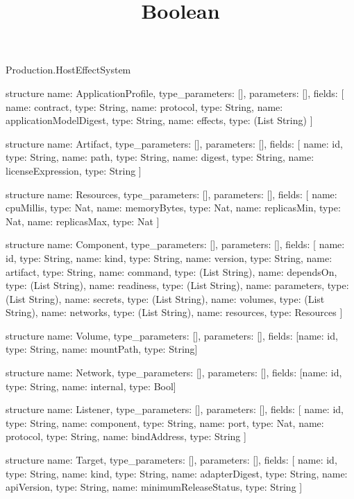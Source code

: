 \begin{lexlean}{Production.HostEffectSystem}
\title{Boolean}
\begin{semanticmodule}
structure{
  name: ApplicationProfile,
  type_parameters: [],
  parameters: [],
  fields: [
    {name: contract, type: String},
    {name: protocol, type: String},
    {name: applicationModelDigest, type: String},
    {name: effects, type: (List String)}
  ]
}

structure{
  name: Artifact,
  type_parameters: [],
  parameters: [],
  fields: [
    {name: id, type: String},
    {name: path, type: String},
    {name: digest, type: String},
    {name: licenseExpression, type: String}
  ]
}

structure{
  name: Resources,
  type_parameters: [],
  parameters: [],
  fields: [
    {name: cpuMillis, type: Nat},
    {name: memoryBytes, type: Nat},
    {name: replicasMin, type: Nat},
    {name: replicasMax, type: Nat}
  ]
}

structure{
  name: Component,
  type_parameters: [],
  parameters: [],
  fields: [
    {name: id, type: String},
    {name: kind, type: String},
    {name: version, type: String},
    {name: artifact, type: String},
    {name: command, type: (List String)},
    {name: dependsOn, type: (List String)},
    {name: readiness, type: (List String)},
    {name: parameters, type: (List String)},
    {name: secrets, type: (List String)},
    {name: volumes, type: (List String)},
    {name: networks, type: (List String)},
    {name: resources, type: Resources}
  ]
}

structure{
  name: Volume,
  type_parameters: [],
  parameters: [],
  fields: [{name: id, type: String}, {name: mountPath, type: String}]
}

structure{
  name: Network,
  type_parameters: [],
  parameters: [],
  fields: [{name: id, type: String}, {name: internal, type: Bool}]
}

structure{
  name: Listener,
  type_parameters: [],
  parameters: [],
  fields: [
    {name: id, type: String},
    {name: component, type: String},
    {name: port, type: Nat},
    {name: protocol, type: String},
    {name: bindAddress, type: String}
  ]
}

structure{
  name: Target,
  type_parameters: [],
  parameters: [],
  fields: [
    {name: id, type: String},
    {name: kind, type: String},
    {name: adapterDigest, type: String},
    {name: apiVersion, type: String},
    {name: minimumReleaseStatus, type: String}
  ]
}


\end{semanticmodule}
\end{lexlean}
